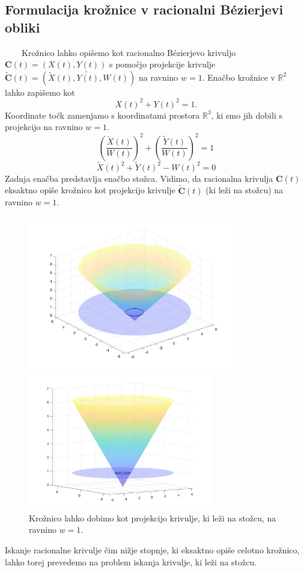\documentclass[a4paper,11pt]{article}
\theoremstyle{definition}
\theoremstyle{plain}
\begin{document}
\subsection{Formulacija krožnice v racionalni B\'ezierjevi obliki}
\ \ \ \
Krožnico lahko opišemo kot racionalno B\'ezierjevo krivuljo $\boldsymbol{C}(t)=(X(t),Y(t))$ s pomočjo projekcije krivulje $\boldsymbol{\tilde{C}}(t)=(\tilde{X}(t), \tilde{Y(t)}, W(t))$ na ravnino $w=1$. 
Enačbo krožnice v $\mathbb{R}^2$ lahko zapišemo kot
$$X(t)^2+Y(t)^2=1.$$
Koordinate točk zamenjamo s koordinatami prostora $\mathbb{R}^3$, ki smo jih dobili s projekcijo na ravnino $w=1$.
$$\left(\frac{\tilde{X}(t)}{W(t)}\right)^2+\left(\frac{\tilde{Y}(t)}{W(t)}\right)^2=1$$
$$\tilde{X}(t)^2+\tilde{Y}(t)^2-W(t)^2=0$$
Zadnja enačba predstavlja enačbo stožca. Vidimo, da racionalna krivulja $\boldsymbol{C}(t)$ eksaktno opiše krožnico kot projekcijo krivulje $\boldsymbol{\tilde{C}}(t)$ (ki leži na stožcu) na ravnino $w = 1$.

\begin{figure}[ht!]
    \begin{minipage}{0.5\textwidth}
        \centering
        \includegraphics[width=90mm]{stozec.png}
    \end{minipage}\hfill
    \begin{minipage}{0.5\textwidth}
        \centering
        \includegraphics[width=80mm]{stozec_1.png}
    \end{minipage}\hfill
    \caption{Krožnico lahko dobimo kot projekcijo krivulje, ki leži na stožcu, na ravnino $w = 1$.}
\end{figure}
\noindent
Iskanje racionalne krivulje čim nižje stopnje, ki eksaktno opiše celotno krožnico, lahko torej prevedemo na problem iskanja krivulje, ki leži na stožcu. 
\\
\end{document}
